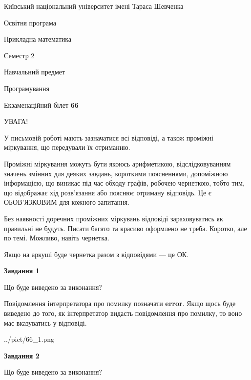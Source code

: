 \documentclass[12pt, ukrainian]{article}
\begin{document}
{{\begin {small}\par
{ \center  Київський національний університет імені Тараса Шевченка \par}
{\parbox {5 cm}{Освітня програма \hfill}{\parbox {7 cm}{Прикладна математика \hfill}}\parbox {6 cm}{\hfill Семестр 2}}\par
{\parbox {5 cm} {Навчальний предмет \hfill}\parbox {7 cm}{Програмування \hfill}\parbox {6cm}{\hfill}\par}\vspace{-7pt} \end{small}}{\center Екзаменаційний білет \No \textbf
{ 66 }\par}}
{
\begin {large}
УВАГА!

У письмовій роботі мають зазначатися всі відповіді, а також проміжні міркування, що передували їх отриманню.

Проміжні міркування можуть бути якоюсь арифметикою, відслідковуванням зна\-чень змінних для деяких завдань,
короткими поясненнями, допоміжною інформацією, що виникає під час обходу графів, робочею чернеткою,
тобто тим, що відображає хід розв’язання або пояснює отриману відповідь.
Це є ОБОВ’ЯЗКОВИМ для кожного запитання.

Без наявності доречних проміжних міркувань відповіді зараховуватись як правиль\-ні не будуть.
Писати багато та красиво оформлено не треба. Коротко, але по темі. Можли\-во, навіть чернетка.

Якщо на аркуші буде чернетка разом з відповідями --- це ОК.

\newpage

{\begin {center}\textbf{Завдання 1}\end {center}}\par
Що буде виведено за виконання?

Повідомлення інтерпретатора про помилку позначати \textbf{error}.
Якщо щось буде виведено до того, як інтерпретатор видасть повідомлення про помилку, 
то воно має вказуватись у відповіді. \par


\begin{center}
	{../pict/66_1.png}
\end{center}
\newpage

{\begin {center}\textbf{Завдання 2}\end {center}}\par
Що буде виведено за виконання?


\end{large}}
\end{document}

